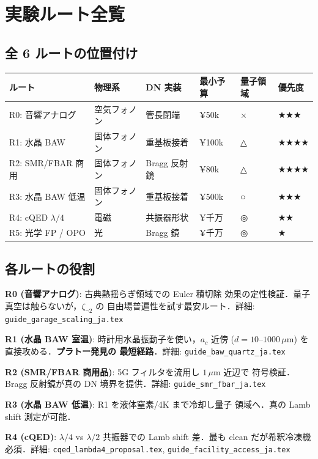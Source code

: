 \documentclass[11pt,a4paper]{article}
\begin{document}
\section{実験ルート全覧}

\subsection{全 6 ルートの位置付け}

\begin{center}
\small
\begin{tabular}{llllll}
\toprule
ルート & 物理系 & DN 実装 & 最小予算 & 量子領域 & 優先度 \\
\midrule
R0: 音響アナログ & 空気フォノン & 管長閉端 & ¥50k & × & ★★★ \\
R1: 水晶 BAW & 固体フォノン & 重基板接着 & ¥100k & △ & ★★★★ \\
R2: SMR/FBAR 商用 & 固体フォノン & Bragg 反射鏡 & ¥80k & △ & ★★★★ \\
R3: 水晶 BAW 低温 & 固体フォノン & 重基板接着 & ¥500k & ○ & ★★★ \\
R4: cQED $\lambda/4$ & 電磁 & 共振器形状 & ¥千万 & ◎ & ★★ \\
R5: 光学 FP / OPO & 光 & Bragg 鏡 & ¥千万 & ◎ & ★ \\
\bottomrule
\end{tabular}
\end{center}

\subsection{各ルートの役割}

\textbf{R0 (音響アナログ)}: 古典熱揺らぎ領域での Euler 積切除
効果の定性検証．量子真空は触らないが，$\zeta_{\neg 2}$ の
自由場普遍性を試す最安ルート．詳細: \texttt{guide\_garage\_scaling\_ja.tex}

\textbf{R1 (水晶 BAW 室温)}: 時計用水晶振動子を使い，$a_c$ 近傍
($d = 10$--$1000\,\mu$m) を直接攻める．\textbf{プラトー発見の
最短経路}．詳細: \texttt{guide\_baw\_quartz\_ja.tex}

\textbf{R2 (SMR/FBAR 商用品)}: 5G フィルタを流用し $1\,\mu$m 近辺で
符号検証．Bragg 反射鏡が真の DN 境界を提供．詳細:
\texttt{guide\_smr\_fbar\_ja.tex}

\textbf{R3 (水晶 BAW 低温)}: R1 を液体窒素/4K まで冷却し量子
領域へ．真の Lamb shift 測定が可能．

\textbf{R4 (cQED)}: $\lambda/4$ vs $\lambda/2$ 共振器での Lamb shift
差．最も clean だが希釈冷凍機必須．詳細: \texttt{cqed\_lambda4\_proposal.tex},
\texttt{guide\_facility\_access\_ja.tex}
\end{document}
